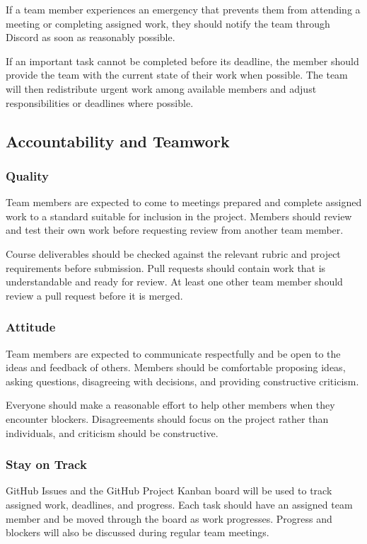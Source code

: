 \documentclass{article}
\begin{document}
If a team member experiences an emergency that prevents them from attending a meeting or completing assigned work, they should notify the team through Discord as soon as reasonably possible.

If an important task cannot be completed before its deadline, the member should provide the team with the current state of their work when possible. The team will then redistribute urgent work among available members and adjust responsibilities or deadlines where possible.

\subsection*{Accountability and Teamwork}

\subsubsection*{Quality} 

Team members are expected to come to meetings prepared and complete assigned work to a standard suitable for inclusion in the project. Members should review and test their own work before requesting review from another team member.

Course deliverables should be checked against the relevant rubric and project requirements before submission. Pull requests should contain work that is understandable and ready for review. At least one other team member should review a pull request before it is merged.

\subsubsection*{Attitude}

Team members are expected to communicate respectfully and be open to the ideas and feedback of others. Members should be comfortable proposing ideas, asking questions, disagreeing with decisions, and providing constructive criticism.

Everyone should make a reasonable effort to help other members when they encounter blockers. Disagreements should focus on the project rather than individuals, and criticism should be constructive.

\subsubsection*{Stay on Track}

GitHub Issues and the GitHub Project Kanban board will be used to track assigned work, deadlines, and progress. Each task should have an assigned team member and be moved through the board as work progresses. Progress and blockers will also be discussed during regular team meetings.
\end{document}
